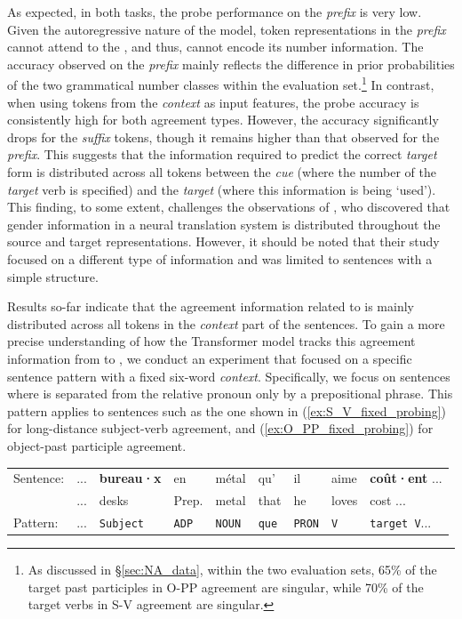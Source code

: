 As expected, in both tasks, the probe performance on the \emph{prefix} is very low. Given the autoregressive nature of the model, token representations in the \emph{prefix} cannot attend to the \cue, and thus, cannot encode its number information. The accuracy observed on the \emph{prefix} mainly reflects the difference in prior probabilities of the two grammatical number classes within the evaluation set.\footnote{As discussed in \S\ref{sec:NA_data}, within the two evaluation sets, 65\% of the target past participles in O-PP agreement are singular, while 70\% of the target verbs in S-V agreement are singular.} In contrast, when using tokens from the \emph{context} as input features, the probe accuracy is consistently high for both agreement types. However, the accuracy significantly drops for the \emph{suffix} tokens, though it remains higher than that observed for the \emph{prefix}. This suggests that the information required to predict the correct \emph{target} form is distributed across all tokens between the \emph{cue} (where the number of the \emph{target} verb is specified) and the \emph{target} (where this information is being `used'). This finding, to some extent, challenges the observations of \cite{wisniewski-etal-2021-screening}, who discovered that gender information in a neural translation system is distributed throughout the source and target representations. However, it should be noted that their study focused on a different type of information and was limited to sentences with a simple structure.

 
Results so-far indicate that the agreement information related to \cue is mainly distributed across all tokens in the \emph{context} part of the sentences. To gain a more precise understanding of how the Transformer model tracks this agreement information from \cue to \target, we conduct an experiment that focused on a specific sentence pattern with a fixed six-word \emph{context}. Specifically, we focus on sentences where \cue is
separated from the relative pronoun only by a prepositional
phrase. This pattern applies to sentences such as the one shown in (\ref{ex:S_V_fixed_probing}) for long-distance subject-verb agreement, and (\ref{ex:O_PP_fixed_probing}) for object-past participle agreement.

\begin{exe}
    \ex \label{ex:S_V_fixed_probing}
    \begin{tabular}{lllllllll}
    Sentence: & ... & \textbf{bureau·x} & en & métal & qu' & il & aime & \textbf{coût·ent } ... \\
    & ... & {\scriptsize desks} & {\scriptsize Prep.} & {\scriptsize metal} & {\scriptsize that} & {\scriptsize he} & {\scriptsize loves} & {\scriptsize cost }... \\
    Pattern: & ... & \texttt{Subject} & \texttt{ADP} & \texttt{NOUN} & \texttt{que} & \texttt{PRON} & \texttt{V} & \texttt{target V}...
    \end{tabular}
\end{exe}

